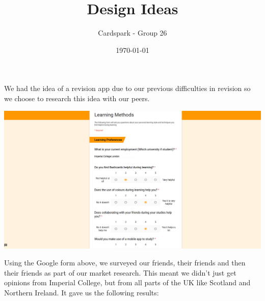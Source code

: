 \documentclass{article}
\begin{document}
\title{Design Ideas}
\author{Cardspark - Group 26}
\date{\today}
\maketitle 

We had the idea of a revision app due to our previous difficulties in revision so we choose to research this idea with our peers.

\begin{center}
	\vspace{1mm}
	\includegraphics[scale=0.14]{form.png}
	\vspace{1mm}
\end{center}

Using the Google form above, we surveyed our friends, their friends and then their friends as part of our market research.  This meant we didn't just get opinions from Imperial College, but from all parts of the UK like Scotland and Northern Ireland.  It gave us the following results:
\end{document}
